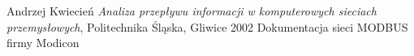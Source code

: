 \documentclass[a4paper,twoside]{article}
\begin{document}



\begin{thebibliography}{3}
	 Andrzej Kwiecień \textit{Analiza przepływu informacji w komputerowych sieciach przemysłowych}, Politechnika Śląska, Gliwice 2002
	 Dokumentacja sieci MODBUS firmy Modicon
\end{thebibliography}
\end{document}
